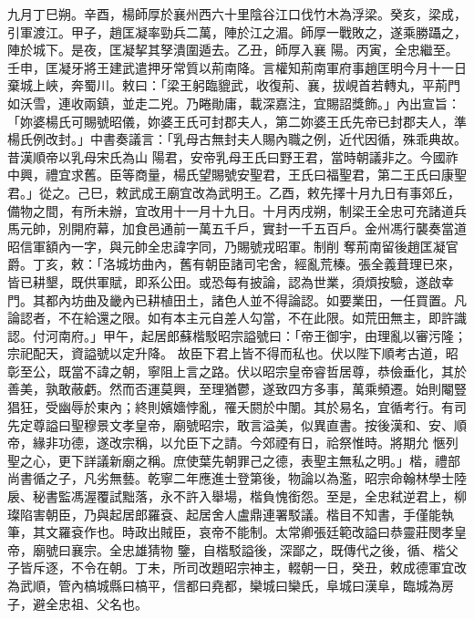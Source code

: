 \begin{pinyinscope}
 九月丁巳朔。辛酉，楊師厚於襄州西六十里陰谷江口伐竹木為浮梁。癸亥，梁成，引軍渡江。甲子，趙匡凝率勁兵二萬，陣於江之湄。師厚一戰敗之，遂乘勝躡之，陣於城下。是夜，匡凝挈其孥潰圍遁去。乙丑，師厚入襄
 陽。丙寅，全忠繼至。壬申，匡凝牙將王建武遣押牙常質以荊南降。言權知荊南軍府事趙匡明今月十一日棄城上峽，奔蜀川。敕曰：「梁王躬臨貔武，收復荊、襄，拔峴首若轉丸，平荊門如沃雪，連收兩鎮，並走二兇。乃睠勛庸，載深嘉注，宜賜詔獎飾。」內出宣旨：「妳婆楊氏可賜號昭儀，妳婆王氏可封郡夫人，第二妳婆王氏先帝已封郡夫人，準楊氏例改封。」中書奏議言：「乳母古無封夫人賜內職之例，近代因循，殊乖典故。昔漢順帝以乳母宋氏為山
 陽君，安帝乳母王氏曰野王君，當時朝議非之。今國祚中興，禮宜求舊。臣等商量，楊氏望賜號安聖君，王氏曰福聖君，第二王氏曰康聖君。」從之。己巳，敕武成王廟宜改為武明王。乙酉，敕先擇十月九日有事郊丘，備物之間，有所未辦，宜改用十一月十九日。十月丙戌朔，制梁王全忠可充諸道兵馬元帥，別開府幕，加食邑通前一萬五千戶，實封一千五百戶。金州馮行襲奏當道昭信軍額內一字，與元帥全忠諱字同，乃賜號戎昭軍。制削
 奪荊南留後趙匡凝官爵。丁亥，敕：「洛城坊曲內，舊有朝臣諸司宅舍，經亂荒榛。張全義葺理已來，皆已耕墾，既供軍賦，即系公田。或恐每有披論，認為世業，須煩按驗，遂啟幸門。其都內坊曲及畿內已耕植田土，諸色人並不得論認。如要業田，一任買置。凡論認者，不在給還之限。如有本主元自差人勾當，不在此限。如荒田無主，即許識認。付河南府。」甲午，起居郎蘇楷駁昭宗謚號曰：「帝王御宇，由理亂以審污隆；宗祀配天，資謚號以定升降。
 故臣下君上皆不得而私也。伏以陛下順考古道，昭彰至公，既當不諱之朝，寧阻上言之路。伏以昭宗皇帝睿哲居尊，恭儉垂化，其於善美，孰敢蔽虧。然而否運莫興，至理猶鬱，遂致四方多事，萬乘頻遷。始則閹豎猖狂，受幽辱於東內；終則嬪嬙悖亂，罹夭閼於中闈。其於易名，宜循考行。有司先定尊謚曰聖穆景文孝皇帝，廟號昭宗，敢言溢美，似異直書。按後漢和、安、順帝，緣非功德，遂改宗稱，以允臣下之請。今郊禋有日，祫祭惟時。將期允
 愜列聖之心，更下詳議新廟之稱。庶使葉先朝罪己之德，表聖主無私之明。」楷，禮部尚書循之子，凡劣無藝。乾寧二年應進士登第後，物論以為濫，昭宗命翰林學士陸扆、秘書監馮渥覆試黜落，永不許入舉場，楷負愧銜怨。至是，全忠弒逆君上，柳璨陷害朝臣，乃與起居郎羅袞、起居舍人盧鼎連署駁議。楷目不知書，手僅能執筆，其文羅袞作也。時政出賊臣，哀帝不能制。太常卿張廷範改謚曰恭靈莊閔孝皇帝，廟號曰襄宗。全忠雄猜物
 鑒，自楷駁謚後，深鄙之，既傳代之後，循、楷父子皆斥逐，不令在朝。丁未，所司改題昭宗神主，輟朝一日，癸丑，敕成德軍宜改為武順，管內槁城縣曰槁平，信都曰堯都，欒城曰欒氏，阜城曰漢阜，臨城為房子，避全忠祖、父名也。




\end{pinyinscope}
